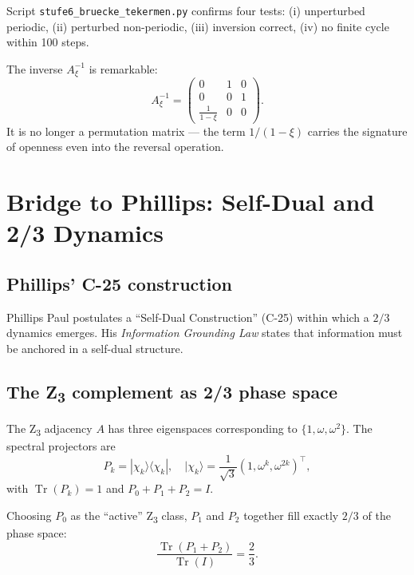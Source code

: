 Script \texttt{stufe6\_bruecke\_tekermen.py} confirms four tests: (i) unperturbed periodic, (ii) perturbed non-periodic, (iii) inversion correct, (iv) no finite cycle within 100 steps.

The inverse \(A_\xi^{-1}\) is remarkable:
\begin{equation}
A_\xi^{-1} = \begin{pmatrix} 0 & 1 & 0 \\ 0 & 0 & 1 \\ \frac{1}{1-\xi} & 0 & 0 \end{pmatrix}.
\end{equation}
It is no longer a permutation matrix --- the term \(1/(1-\xi)\) carries the signature of openness even into the reversal operation.

\section{Bridge to Phillips: Self-Dual and 2/3 Dynamics}
\label{sec:phillips}

\subsection{Phillips' C-25 construction}

Phillips Paul postulates a ``Self-Dual Construction'' (C-25) within which a \(2/3\) dynamics emerges. His \emph{Information Grounding Law} states that information must be anchored in a self-dual structure.

\subsection[The Z3 complement as 2/3 phase space]{The Z\textsubscript{3} complement as 2/3 phase space}

The Z\textsubscript{3} adjacency \(A\) has three eigenspaces corresponding to \(\{1, \omega, \omega^2\}\). The spectral projectors are
\begin{equation}
P_k = |\chi_k\rangle\langle\chi_k|, \quad |\chi_k\rangle = \frac{1}{\sqrt{3}}(1, \omega^k, \omega^{2k})^\top,
\end{equation}
with \(\operatorname{Tr}(P_k) = 1\) and \(P_0 + P_1 + P_2 = I\).

\begin{keyresult}
Choosing \(P_0\) as the ``active'' Z\textsubscript{3} class, \(P_1\) and \(P_2\) together fill exactly \(2/3\) of the phase space:
\begin{equation}
\frac{\operatorname{Tr}(P_1 + P_2)}{\operatorname{Tr}(I)} = \frac{2}{3}.
\end{equation}
\end{keyresult}

